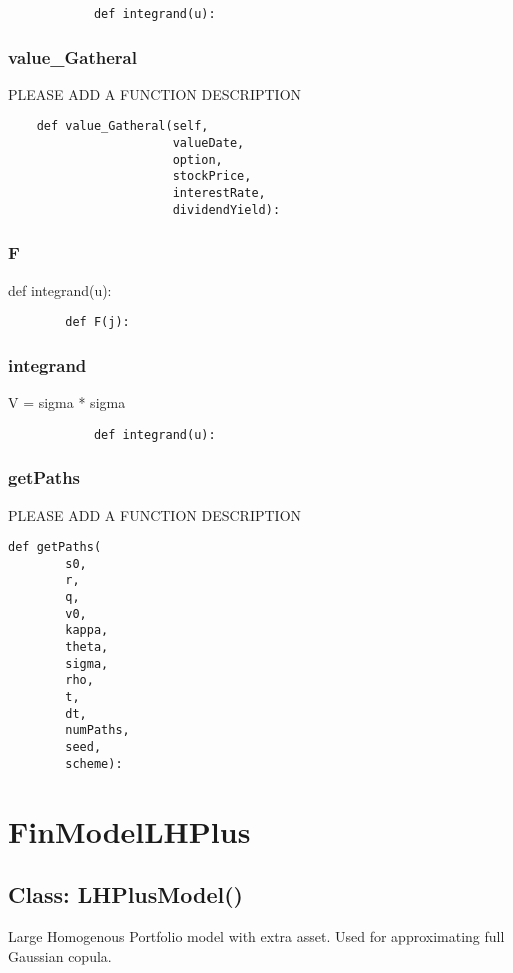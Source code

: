 \documentclass[twoside,11pt]{book}
\begin{document}
\begin{lstlisting}
            def integrand(u):
\end{lstlisting}

\subsubsection*{{\bf value\_Gatheral}}
PLEASE ADD A FUNCTION DESCRIPTION

\begin{lstlisting}
    def value_Gatheral(self,
                       valueDate,
                       option,
                       stockPrice,
                       interestRate,
                       dividendYield):
\end{lstlisting}

\subsubsection*{{\bf F}}
def integrand(u): 

\begin{lstlisting}
        def F(j):
\end{lstlisting}

\subsubsection*{{\bf integrand}}
V = sigma * sigma 

\begin{lstlisting}
            def integrand(u):
\end{lstlisting}

\subsubsection*{{\bf getPaths}}
PLEASE ADD A FUNCTION DESCRIPTION

\begin{lstlisting}
def getPaths(
        s0,
        r,
        q,
        v0,
        kappa,
        theta,
        sigma,
        rho,
        t,
        dt,
        numPaths,
        seed,
        scheme):
\end{lstlisting}

\newpage
\section{FinModelLHPlus}

\subsection*{Class: LHPlusModel()}
Large Homogenous Portfolio model with extra asset. Used for approximating full Gaussian copula.  
\end{document}
